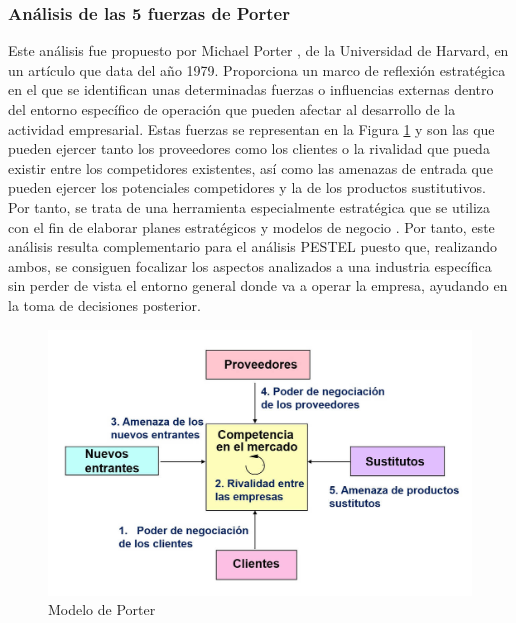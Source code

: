 \subsubsection{Análisis de las 5 fuerzas de Porter}
Este análisis fue propuesto por Michael Porter \cite{Porter1989HowStrategy}, de la Universidad de Harvard, en un artículo que data del año 1979. Proporciona un marco de reflexión estratégica en el que se identifican unas determinadas fuerzas o influencias externas dentro del entorno específico de operación que pueden afectar al desarrollo de la actividad empresarial. Estas fuerzas se representan en la Figura \ref{fig:fuerzas_porter} y son las que pueden ejercer tanto los proveedores como los clientes o la rivalidad que pueda existir entre los competidores existentes, así como las amenazas de entrada que pueden ejercer los potenciales competidores y la de los productos sustitutivos. Por tanto, se trata de una herramienta especialmente estratégica que se utiliza con el fin de elaborar planes estratégicos y modelos de negocio \cite{josemanuel}. Por tanto, este análisis resulta complementario para el análisis PESTEL puesto que, realizando ambos, se consiguen focalizar los aspectos analizados a una industria específica sin perder de vista el entorno general donde va a operar la empresa, ayudando en la toma de decisiones posterior.

\begin{figure}[h]
  \centering
  \includegraphics[width=0.75\linewidth]{figures/images/las-5-fuerzas-de-porter.jpg}
  \caption{Modelo de Porter}
  \label{fig:fuerzas_porter}
\end{figure}

\clearpage

